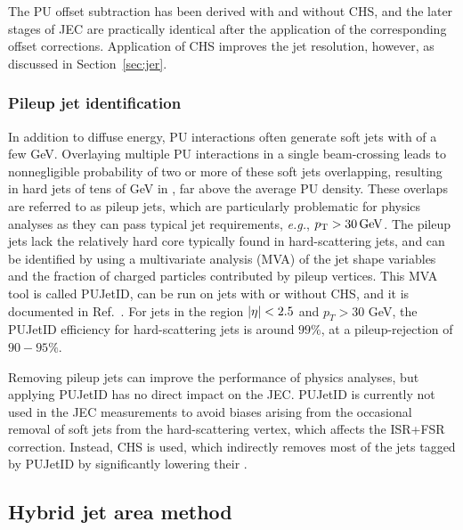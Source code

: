 \documentclass[11pt,twoside,a4paper,cmspaper,final,collab]{cms-tdr}
\begin{document}
The PU offset subtraction has been derived with and without CHS, and the later stages of JEC are practically identical after the application of the corresponding offset corrections.
Application of CHS improves the jet \pt resolution, however, as discussed in Section~\ref{sec:jer}.

\subsubsection*{Pileup jet identification}\label{sec:pujetid}

In addition to diffuse energy, PU interactions often generate soft jets with \pt of a few GeV. Overlaying multiple PU interactions in a single beam-crossing leads to nonnegligible probability of two or more of these soft jets overlapping, resulting in hard jets of tens of GeV in \pt, far above the average PU \pt density. These overlaps are referred to as pileup jets, which are particularly problematic for physics analyses as they can pass typical jet \pt requirements, \textit{e.g.}, $p_{\mathrm{T}}>30\,\text{Ge\hspace{-.08em}V}$. The pileup jets lack the relatively hard core typically found in hard-scattering jets, and can be identified by using a multivariate analysis (MVA) of the jet shape variables and the fraction of charged particles contributed by pileup vertices. This MVA tool is called PUJetID, can be run on jets with or without CHS, and it is documented in Ref.~\cite{CMS-PAS-JME-13-005}.  For jets in the region $\lvert \eta \rvert<2.5$ and $p_{T}>30$ GeV, the PUJetID efficiency for hard-scattering jets is around $99\%$, at a pileup-rejection of $90-95\%$.

Removing pileup jets can improve the performance of physics analyses, but applying PUJetID has no direct impact on the JEC. PUJetID is currently not used in the JEC measurements to avoid biases arising from the occasional removal of soft jets from the hard-scattering vertex, which affects the ISR+FSR correction. Instead, CHS is used, which indirectly removes most of the jets tagged by PUJetID by significantly lowering their \pt.

\subsection{Hybrid jet area method}\label{sec:jetarea}
\end{document}
